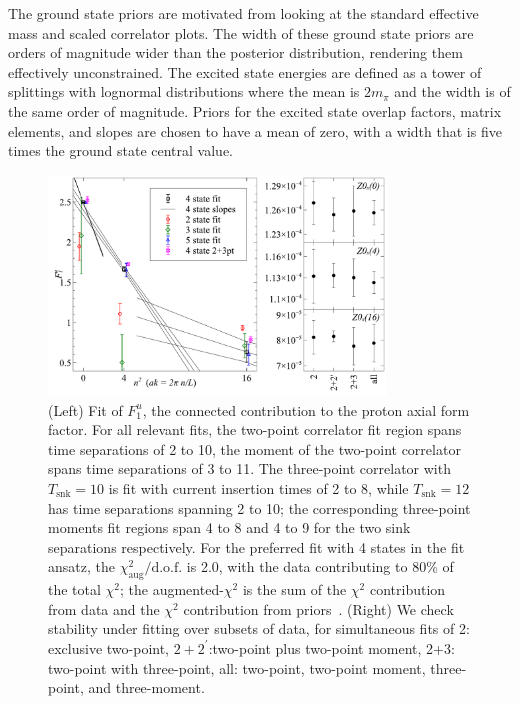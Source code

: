 \documentclass{PoS}
\begin{document}
The ground state priors are motivated from looking at the standard effective mass and scaled correlator plots. The width of these ground state priors are orders of magnitude wider than the posterior distribution, rendering them effectively unconstrained. The excited state energies are defined as a tower of splittings with lognormal distributions where the mean is $2m_\pi$ and the width is of the same order of magnitude. Priors for the excited state overlap factors, matrix elements, and slopes are chosen to have a mean of zero, with a width that is five times the ground state central value.

\begin{figure}[h]
	\centering
		\includegraphics[width=0.8\textwidth]{./gV.pdf}
	\caption{(Left) Fit of $F_1^u$, the connected contribution to the proton axial form factor. For all relevant fits, the two-point correlator fit region spans time separations of 2 to 10, the moment of the two-point correlator spans time separations of 3 to 11. The three-point correlator with $T_{\text{snk}}=10$ is fit with current insertion times of 2 to 8, while $T_{\text{snk}}=12$ has time separations spanning 2 to 10; the corresponding three-point moments fit regions span 4 to 8 and 4 to 9 for the two sink separations respectively. For the preferred fit with 4 states in the fit ansatz, the $\chi^2_\text{aug}/\text{d.o.f.}$ is 2.0, with the data contributing to 80\% of the total $\chi^2$; the augmented-$\chi^2$ is the sum of the $\chi^2$ contribution from data and the $\chi^2$ contribution from priors~\cite{Lepage:2001ym}. (Right) We check stability under fitting over subsets of data, for simultaneous fits of 2: exclusive two-point, $2+2^\prime$:two-point plus two-point moment, 2+3: two-point with three-point, all: two-point, two-point moment, three-point, and three-moment.}
	\label{fig:gV}
\end{figure}
\end{document}
